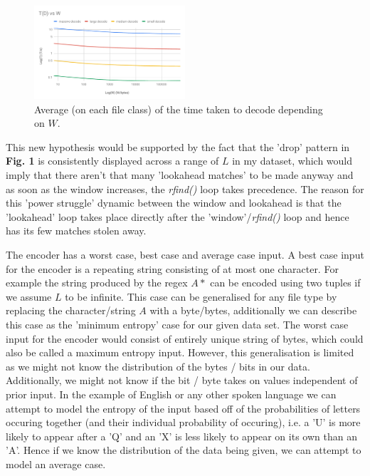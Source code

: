 \documentclass[a4paper, 10pt]{article}
\begin{document}
\begin{figure}
  \centering
  \includegraphics[width=0.5\textwidth]{TDvsW.pdf}
  \caption{Average (on each file class) of the time taken to decode depending on $W$.}
\end{figure}

This new hypothesis would be supported by the fact that the 'drop' pattern in \textbf{Fig. 1} is consistently displayed across a range of $L$ in my dataset, which would imply that there aren't that many 'lookahead matches' to be made anyway and as soon as the window increases, the \textit{rfind()} loop takes precedence. The reason for this 'power struggle' dynamic between the window and lookahead is that the 'lookahead' loop takes place directly after the 'window'/\textit{rfind()} loop and hence has its few matches stolen away.

The encoder has a worst case, best case and average case input. A best case input for the encoder is a repeating string consisting of at most one character. For example the string produced by the regex $A*$ can be encoded using two tuples if we assume $L$ to be infinite. This case can be generalised for any file type by replacing the character/string $A$ with a byte/bytes, additionally we can describe this case as the 'minimum entropy' case for our given data set. The worst case input for the encoder would consist of entirely unique string of bytes, which could also be called a maximum entropy input. However, this generalisation is limited as we might not know the distribution of the bytes / bits in our data. Additionally, we might not know if the bit / byte takes on values independent of prior input. In the example of English or any other spoken language we can attempt to model the entropy of the input based off of the probabilities of letters occuring together (and their individual probability of occuring), i.e. a 'U' is more likely to appear after a 'Q' and an 'X' is less likely to appear on its own than an 'A'. Hence if we know the distribution of the data being given, we can attempt to model an average case.
\end{document}
